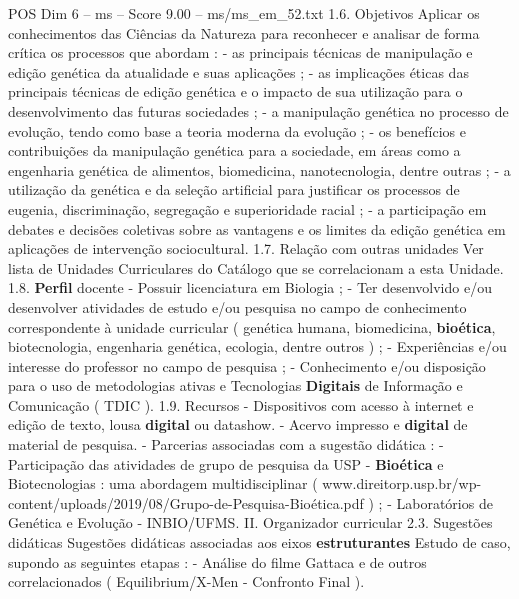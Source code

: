 \begin{textsample}{POS Dim 6 – ms – Score 9.00 – ms/ms\_em\_52.txt}  \label{ex:f6_pos_056}
1.6.
Objetivos Aplicar os conhecimentos das Ciências da Natureza para reconhecer e analisar de forma crítica os processos que abordam : - as principais técnicas de manipulação e edição genética da atualidade e suas aplicações ; - as implicações éticas das principais técnicas de edição genética e o impacto de sua utilização para o desenvolvimento das futuras sociedades ; - a manipulação genética no processo de evolução, tendo como base a teoria moderna da evolução ; - os benefícios e contribuições da manipulação genética para a sociedade, em áreas como a engenharia genética de alimentos, biomedicina, nanotecnologia, dentre outras ; - a utilização da genética e da seleção artificial para justificar os processos de eugenia, discriminação, segregação e superioridade racial ; - a participação em debates e decisões coletivas sobre as vantagens e os limites da edição genética em aplicações de intervenção sociocultural. 1.7.
Relação com outras unidades Ver lista de Unidades Curriculares do Catálogo que se correlacionam a esta Unidade. 1.8. \textbf{Perfil} docente - Possuir licenciatura em Biologia ; - Ter desenvolvido e/ou desenvolver atividades de estudo e/ou pesquisa no campo de conhecimento correspondente à unidade curricular ( genética humana, biomedicina, \textbf{bioética}, biotecnologia, engenharia genética, ecologia, dentre outros ) ; - Experiências e/ou interesse do professor no campo de pesquisa ; - Conhecimento e/ou disposição para o uso de metodologias ativas e Tecnologias \textbf{Digitais} de Informação e Comunicação ( TDIC ). 1.9.
Recursos - Dispositivos com acesso à internet e edição de texto, lousa \textbf{digital} ou datashow. - Acervo impresso e \textbf{digital} de material de pesquisa. - Parcerias associadas com a sugestão didática : - Participação das atividades de grupo de pesquisa da USP - \textbf{Bioética} e Biotecnologias : uma abordagem multidisciplinar ( www.direitorp.usp.br/wp-content/uploads/2019/08/Grupo-de-Pesquisa-Bioética.pdf ) ; - Laboratórios de Genética e Evolução - INBIO/UFMS.
II.
Organizador curricular 2.3.
Sugestões didáticas Sugestões didáticas associadas aos eixos \textbf{estruturantes} Estudo de caso, supondo as seguintes etapas : - Análise do filme Gattaca e de outros correlacionados ( Equilibrium/X-Men - Confronto Final ).

\end{textsample}
